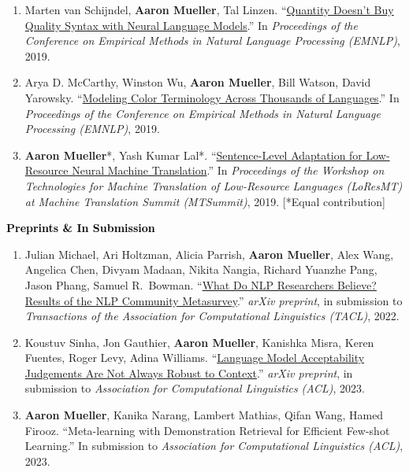 \documentclass[10pt]{article}
\renewcommand{\subsection}[1]{\textcolor{black}{#1}}
\newcommand{\halfblankline}{\quad\vspace{-0.5\baselineskip}\pagebreak[3]}
\providecommand*\titlelink[2]{\href{#1}{\textcolor{accent}{#2}}}
\begin{document}
\begin{enumerate}[leftmargin=*, topsep=0pt, itemsep=0.25ex, partopsep=0ex, parsep=1ex]
	\item Marten van Schijndel, \textbf{Aaron Mueller}, Tal Linzen. ``\titlelink{https://aclanthology.org/D19-1592/}{Quantity Doesn't Buy Quality Syntax with Neural Language Models}.'' In \emph{Proceedings of the Conference on Empirical Methods in Natural Language Processing (EMNLP)}, 2019.

	\item Arya D. McCarthy, Winston Wu, \textbf{Aaron Mueller}, Bill Watson, David Yarowsky. ``\titlelink{https://aclanthology.org/D19-1229/}{Modeling Color Terminology Across Thousands of Languages}.'' In \emph{Proceedings of the Conference on Empirical Methods in Natural Language Processing (EMNLP)}, 2019.

	\item \textbf{Aaron Mueller}*, Yash Kumar Lal*. ``\titlelink{https://aclanthology.org/W19-6807/}{Sentence-Level Adaptation for Low-Resource Neural Machine Translation}.'' In \emph{Proceedings of the Workshop on Technologies for Machine Translation of Low-Resource Languages (LoResMT) at Machine Translation Summit (MTSummit)}, 2019. [*Equal contribution]\label{pub:sent-level}
	\end{enumerate}



	\halfblankline

	\subsection{\textbf{Preprints \& In Submission}}
	\begin{enumerate}[resume,leftmargin=*, topsep=0pt, itemsep=0.25ex, partopsep=0ex, parsep=1ex]
	\item Julian Michael, Ari Holtzman, Alicia Parrish, \textbf{Aaron Mueller}, Alex Wang, Angelica Chen, Divyam Madaan, Nikita Nangia, Richard Yuanzhe Pang, Jason Phang, Samuel R.\ Bowman. ``\titlelink{https://arxiv.org/abs/2208.12852}{What Do NLP Researchers Believe? Results of the NLP Community Metasurvey}.'' \emph{arXiv preprint}, in submission to \emph{Transactions of the Association for Computational Linguistics (TACL)}, 2022.
	
	\item Koustuv Sinha, Jon Gauthier, \textbf{Aaron Mueller}, Kanishka Misra, Keren Fuentes, Roger Levy, Adina Williams. ``\titlelink{https://arxiv.org/abs/2212.08979}{Language Model Acceptability Judgements Are Not Always Robust to Context}.'' \emph{arXiv preprint}, in submission to \emph{Association for Computational Linguistics (ACL)}, 2023.
 
	\item \textbf{Aaron Mueller}, Kanika Narang, Lambert Mathias, Qifan Wang, Hamed Firooz. ``Meta-learning with Demonstration Retrieval for Efficient Few-shot Learning.'' In submission to \textit{Association for Computational Linguistics (ACL)}, 2023.\label{pub:metalearn}
	\end{enumerate}
\end{document}
